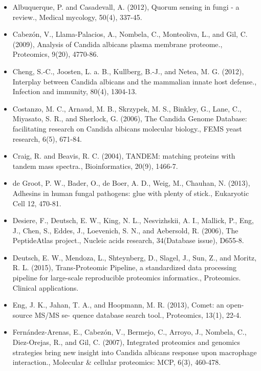 \begin{itemize}

\item[]{%
Albuquerque, P. and Casadevall, A. (2012), Quorum sensing in fungi - a review.,
Medical mycology, 50(4), 337-45.
}

\item[]{%
Cabez\'on, V., Llama-Palacios, A., Nombela, C., Monteoliva, L., and Gil, C. (2009), Analysis of
Candida albicans plasma membrane proteome., Proteomics, 9(20), 4770-86.
}


\item[]{%
Cheng, S.-C., Joosten, L. a. B., Kullberg, B.-J., and Netea, M. G. (2012), Interplay between
Candida albicans and the mammalian innate host defense., Infection and immunity, 80(4),
1304-13.
}

\item[]{%
Costanzo, M. C., Arnaud, M. B., Skrzypek, M. S., Binkley, G., Lane, C., Miyasato, S. R., and
Sherlock, G. (2006), The Candida Genome Database: facilitating research on 
Candida albicans molecular biology., FEMS yeast research, 6(5), 671-84.
}

\item[]{%
Craig, R. and Beavis, R. C. (2004), TANDEM: matching proteins with tandem mass spectra.,
Bioinformatics, 20(9), 1466-7.
}

\item[]{
de Groot, P. W., Bader, O., de Boer, A. D., Weig, M., Chauhan, N. (2013),
Adhesins in human fungal pathogens: glue with plenty of stick., 
Eukaryotic Cell 12, 470-81.
}

\item[]{%
Desiere, F., Deutsch, E. W., King, N. L., Nesvizhskii, A. I., Mallick, P., Eng, J., Chen, S., Eddes,
J., Loevenich, S. N., and Aebersold, R. (2006), The PeptideAtlas project., Nucleic acids
research, 34(Database issue), D655-8.
}

\item[]{%
Deutsch, E. W., Mendoza, L., Shteynberg, D., Slagel, J., Sun, Z., and Moritz, R. L. (2015),
Trans-Proteomic Pipeline, a standardized data processing pipeline for large-scale 
reproducible proteomics informatics., Proteomics. Clinical applications.
}

\item[]{%
Eng, J. K., Jahan, T. A., and Hoopmann, M. R. (2013), Comet: an open-source MS/MS se-
quence database search tool., Proteomics, 13(1), 22-4.
}

\item[]{%
Fern\'andez-Arenas, E., Cabez\'on, V., Bermejo, C., Arroyo, J., Nombela, C., Diez-Orejas, R.,
and Gil, C. (2007), Integrated proteomics and genomics strategies bring new insight into
Candida albicans response upon macrophage interaction., 
Molecular \& cellular proteomics: MCP, 6(3), 460-478.
}


\end{itemize}
